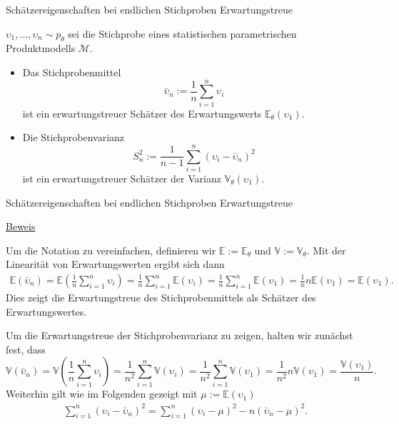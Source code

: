 \documentclass[
  8pt,
  ignorenonframetext,
]{beamer}
\newcommand{\ups} {\upsilon}
\begin{document}
\begin{frame}{\small Schätzereigenschaften bei endlichen Stichproben
\textbar{} Erwartungstreue}
\protect\hypertarget{schuxe4tzereigenschaften-bei-endlichen-stichproben-erwartungstreue-1}{}
\small
\begin{theorem}
\justifying
\normalfont
$\ups_1,...,\ups_n \sim p_\theta$ sei die Stichprobe eines statistischen parametrischen Produktmodells $\mathcal{M}$.
\begin{itemize}
\item Das Stichprobenmittel
\begin{equation}
\bar{\ups}_n := \frac{1}{n}\sum_{i=1}^n \ups_i
\end{equation}
ist ein erwartungstreuer Schätzer des Erwartungswerts $\mathbb{E}_\theta(\ups_1)$.
\vspace{1mm}
\item Die Stichprobenvarianz
\begin{equation}
S^2_n := \frac{1}{n-1}\sum_{i=1}^n (\ups_i - \bar{\ups}_n)^2
\end{equation}
ist ein erwartungstreuer Schätzer der Varianz $\mathbb{V}_\theta(\ups_1)$.
\end{itemize}
\end{theorem}
\end{frame}

\begin{frame}{\small Schätzereigenschaften bei endlichen Stichproben
\textbar{} Erwartungstreue}
\protect\hypertarget{schuxe4tzereigenschaften-bei-endlichen-stichproben-erwartungstreue-2}{}
\footnotesize

\underline{Beweis}

Um die Notation zu vereinfachen, definieren wir
\(\mathbb{E} := \mathbb{E}_\theta\) und
\(\mathbb{V} := \mathbb{V}_\theta\). Mit der Linearität von
Erwartungswerten ergibt sich dann \begin{align*}
\mathbb{E}(\bar{\ups}_n)
= \mathbb{E} \left(\frac{1}{n}\sum_{i=1}^n  \ups_i \right)
= \frac{1}{n}\sum_{i=1}^n  \mathbb{E}\left( \ups_i \right)
= \frac{1}{n}\sum_{i=1}^n  \mathbb{E}\left( \ups_1 \right)
= \frac{1}{n} n  \mathbb{E}\left( \ups_1 \right)
=  \mathbb{E}\left( \ups_1 \right).
\end{align*} Dies zeigt die Erwartungstreue des Stichprobenmittels als
Schätzer des Erwartungswertes.

Um die Erwartungstreue der Stichprobenvarianz zu zeigen, halten wir
zunächst fest, dass \begin{equation*}
\mathbb{V}(\bar{\ups}_n)
= \mathbb{V}\left(\frac{1}{n} \sum_{i=1}^n \ups_i \right)
= \frac{1}{n^2} \sum_{i=1}^n \mathbb{V}\left( \ups_i \right)
= \frac{1}{n^2} \sum_{i=1}^n  \mathbb{V}\left( \ups_1 \right)
= \frac{1}{n^2} n \mathbb{V}\left( \ups_1 \right)
= \frac{\mathbb{V}\left( \ups_1 \right)}{n}.
\end{equation*} Weiterhin gilt wie im Folgenden gezeigt mit
\(\mu := \mathbb{E}(\ups_1)\) \begin{align*}
\sum_{i=1}^n \left(\ups_i - \bar{\ups}_n\right)^2 = \sum_{i=1}^n (\ups_i - \mu)^2 - n(\bar{\ups}_n - \mu)^2.
\end{align*}
\end{frame}
\end{document}
